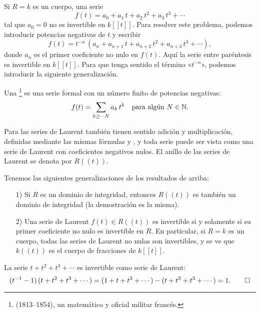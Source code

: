\documentclass{article}
\numberwithin{equation}{section}
\theoremstyle{definition}
\begin{document}
Si $R = k$ es un cuerpo, una serie
$$f (t) = a_0 + a_1\,t + a_2\,t^2 + a_3\,t^3 + \cdots$$
tal que $a_0 = 0$ no es invertible en $k [\![t]\!]$. Para resolver este
problema, podemos introducir potencias negativas de $t$ y escribir
$$f (t) = t^{-n} \, (a_n + a_{n+1}\,t + a_{n+2}\,t^2 + a_{n+3}\,t^3 + \cdots),$$
donde $a_n$ es el primer coeficiente no nulo en $f (t)$. Aquí la serie entre
paréntesis es invertible en $k [\![t]\!]$. Para que tenga sentido el término
«$t^{-n}$», podemos introducir la siguiente generalización.

\begin{definicion}
  Una \footnote{\href{http://www-history.mcs.st-andrews.ac.uk/Biographies/Laurent_Pierre.html}{} (1813--1854), un matemático y oficial militar francés.}
  es una serie formal con un número finito de potencias negativas:
  $$f(t) = \sum_{k \ge -N} a_k\,t^k\quad \text{para algún }N\in \mathbb{N}.$$
\end{definicion}

Para las series de Laurent también tienen sentido adición y multiplicación,
definidas mediante las mismas fórmulas 
y , y toda serie puede ser vista como
una serie de Laurent con coeficientes negativos nulos. El anillo de las series
de Laurent se denota por $R (\!(t)\!)$.

\vspace{1em}

Tenemos las siguientes generalizaciones de los resultados de arriba:

\begin{enumerate}
\item[1)] Si $R$ es un dominio de integridad, entonces $R (\!(t)\!)$ es también
  un dominio de integridad (la demostración es la misma).

\item[2)] Una serie de Laurent $f (t) \in R (\!(t)\!)$ es invertible si y
  solamente si su primer coeficiente no nulo es invertible en $R$. En
  particular, si $R = k$ es un cuerpo, todas las series de Laurent no nulas son
  invertibles, y se ve que $k (\!(t)\!)$ es el cuerpo de fracciones de
  $k [\![t]\!]$.
\end{enumerate}

\begin{ejemplo}
  La serie $t + t^2 + t^3 + \cdots$ es invertible como serie de Laurent:
  \[ (t^{-1} - 1)\,(t + t^2 + t^3 + \cdots) =
    (1 + t + t^2 + \cdots) - (t + t^2 + t^3 + \cdots) = 1. \qedhere \]
\end{ejemplo}
\end{document}
